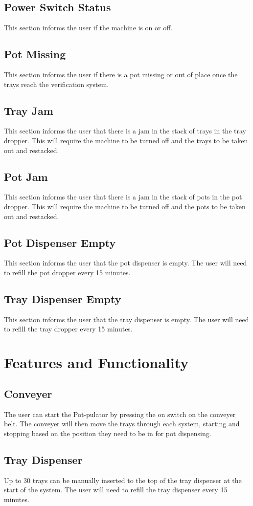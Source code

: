 \documentclass{article}
\begin{document}
\subsection{Power Switch Status}
This section informs the user if the machine is on or off.
\subsection{Pot Missing}
This section informs the user if there is a pot missing or out of place once the trays reach the verification system.
\subsection{Tray Jam}
This section informs the user that there is a jam in the stack of trays in the tray dropper. This will require the machine to be turned off and the trays to be taken out and restacked. 
\subsection{Pot Jam}
This section informs the user that there is a jam in the stack of pots in the pot dropper. This will require the machine to be turned off and the pots to be taken out and restacked. 
\subsection{Pot Dispenser Empty}
This section informs the user that the pot dispenser is empty. The user will need to refill the pot dropper every 15 minutes.
\subsection{Tray Dispenser Empty}
This section informs the user that the tray dispenser is empty. The user will need to refill the tray dropper every 15 minutes.
\section{Features and Functionality}
\subsection{Conveyer}
The user can start the Pot-pulator by pressing the on switch on the conveyer belt. The conveyer will then move the trays through each system, starting and stopping based on the position they need to be in for pot dispensing. 
\subsection{Tray Dispenser}
Up to 30 trays can be manually inserted to the top of the tray dispenser at the start of the system. The user will need to refill the tray dispenser every 15 minutes.
\end{document}
